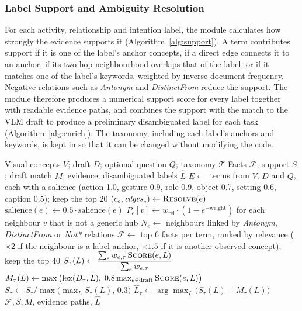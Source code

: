 \subsubsection{Label Support and Ambiguity Resolution}
For each activity, relationship and intention label, the module calculates how strongly the evidence supports it (Algorithm~\ref{alg:support}). A term contributes support if it is one of the label's anchor concepts, if a direct edge connects it to an anchor, if its two-hop neighbourhood overlaps that of the label, or if it matches one of the label's keywords, weighted by inverse document frequency. Negative relations such as \emph{Antonym} and \emph{DistinctFrom} reduce the support. The module therefore produces a numerical support score for every label together with readable evidence paths, and combines the support with the match to the VLM draft to produce a preliminary disambiguated label for each task (Algorithm~\ref{alg:enrich}). The taxonomy, including each label's anchors and keywords, is kept in  so that it can be changed without modifying the code.

\begin{algorithm}[H]
\caption{ConceptNet Commonsense Enrichment}
\label{alg:enrich}
\begin{algorithmic}[1]
\Require Visual concepts $V$; draft $D$; optional question $Q$; taxonomy $\mathcal{T}$
\Ensure Facts $\mathcal{F}$; support $S$; draft match $M$; evidence; disambiguated labels $\hat{L}$
\State $E \gets$ terms from $V$, $D$ and $Q$, each with a salience (action 1.0, gesture 0.9, role 0.9, object 0.7, setting 0.6, caption 0.5); keep the top 20
  \State $(c_e, \mathit{edges}_e) \gets \textsc{Resolve}(e)$ 
    \State $\mathrm{salience}(e) \gets 0.5 \cdot \mathrm{salience}(e)$ 
  \EndIf
  \State $P_e[v] \gets w_{\text{rel}} \cdot (1 - e^{-\text{weight}})$ for each neighbour $v$ that is not a generic hub
  \State $N_e \gets$ neighbours linked by \emph{Antonym}, \emph{DistinctFrom} or \emph{Not*} relations
\EndFor
\State $\mathcal{F} \gets$ top 6 facts per term, ranked by relevance ($\times 2$ if the neighbour is a label anchor, $\times 1.5$ if it is another observed concept); keep the top 40
    \State $S_\tau(L) \gets \dfrac{\sum_e w_{e,\tau}\, \textsc{Score}(e, L)}{\sum_e w_{e,\tau}}$ 
    \State $M_\tau(L) \gets \max\big(\mathrm{lex}(D_\tau, L),\; 0.8 \max_{e \in \text{draft}} \textsc{Score}(e, L)\big)$
  \EndFor
  \State $S_\tau \gets S_\tau / \max\big(\max_L S_\tau(L),\, 0.3\big)$
  \State $\hat{L}_\tau \gets \arg\max_L \big(S_\tau(L) + M_\tau(L)\big)$
\EndFor
\State \Return $\mathcal{F}, S, M$, evidence paths, $\hat{L}$
\end{algorithmic}
\end{algorithm}

